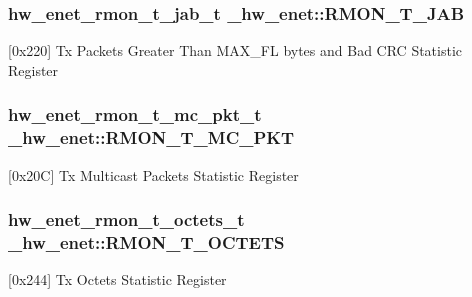\subsubsection[{\texorpdfstring{R\+M\+O\+N\+\_\+\+T\+\_\+\+J\+AB}{RMON_T_JAB}}]{ {\bf hw\+\_\+enet\+\_\+rmon\+\_\+t\+\_\+jab\+\_\+t} \+\_\+hw\+\_\+enet\+::\+R\+M\+O\+N\+\_\+\+T\+\_\+\+J\+AB}\hypertarget{struct__hw__enet_a289f37cb6e50cd179e2b2400a8c434dc}{}\label{struct__hw__enet_a289f37cb6e50cd179e2b2400a8c434dc}
\mbox{[}0x220\mbox{]} Tx Packets Greater Than M\+A\+X\+\_\+\+FL bytes and Bad C\+RC Statistic Register 
\subsubsection[{\texorpdfstring{R\+M\+O\+N\+\_\+\+T\+\_\+\+M\+C\+\_\+\+P\+KT}{RMON_T_MC_PKT}}]{ {\bf hw\+\_\+enet\+\_\+rmon\+\_\+t\+\_\+mc\+\_\+pkt\+\_\+t} \+\_\+hw\+\_\+enet\+::\+R\+M\+O\+N\+\_\+\+T\+\_\+\+M\+C\+\_\+\+P\+KT}\hypertarget{struct__hw__enet_a3484e7e33bcf2dbbc3cd2ff098a59add}{}\label{struct__hw__enet_a3484e7e33bcf2dbbc3cd2ff098a59add}
\mbox{[}0x20C\mbox{]} Tx Multicast Packets Statistic Register 
\subsubsection[{\texorpdfstring{R\+M\+O\+N\+\_\+\+T\+\_\+\+O\+C\+T\+E\+TS}{RMON_T_OCTETS}}]{ {\bf hw\+\_\+enet\+\_\+rmon\+\_\+t\+\_\+octets\+\_\+t} \+\_\+hw\+\_\+enet\+::\+R\+M\+O\+N\+\_\+\+T\+\_\+\+O\+C\+T\+E\+TS}\hypertarget{struct__hw__enet_a7dbb8720ab9339f8451b94930f09047e}{}\label{struct__hw__enet_a7dbb8720ab9339f8451b94930f09047e}
\mbox{[}0x244\mbox{]} Tx Octets Statistic Register 
